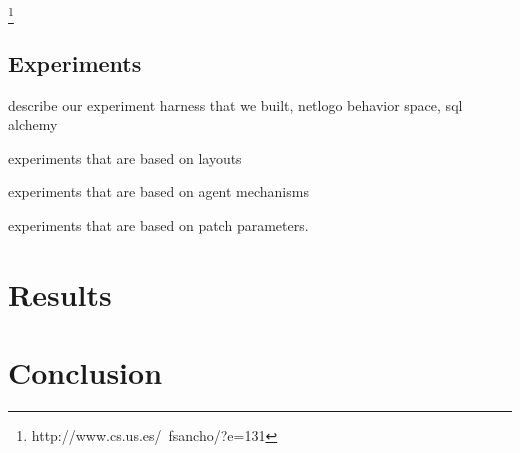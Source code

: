 \documentclass[12pt,letterpaper]{article}
\begin{document}
\cite{mirahmadiNovelAlgorithmRealtime2012}
\footnote{http://www.cs.us.es/~fsancho/?e=131}

\subsection{Experiments}

describe our experiment harness that we built, netlogo behavior space, sql alchemy

experiments that are based on layouts

experiments that are based on agent mechanisms

experiments that are based on patch parameters.
\section{Results}



\section {Conclusion}



\end{document}
